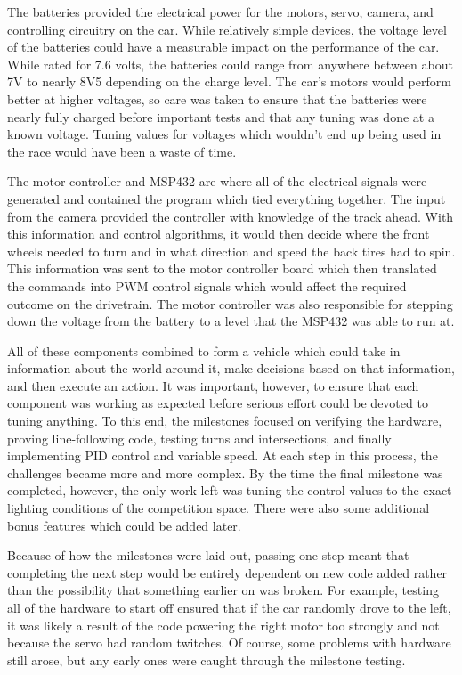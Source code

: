 \documentclass[conference]{IEEEtran}
\begin{document}
    The batteries provided the electrical power for the motors, servo, camera,
    and controlling circuitry on the car. While relatively simple devices, the
    voltage level of the batteries could have a measurable impact on the
    performance of the car. While rated for 7.6 volts, the batteries could
    range from anywhere between about 7V to nearly 8V5 depending on the charge
    level. The car's motors would perform better at higher voltages, so care
    was taken to ensure that the batteries were nearly fully charged before
    important tests and that any tuning was done at a known voltage. Tuning
    values for voltages which wouldn't end up being used in the race would
    have been a waste of time.
    
    The motor controller and MSP432 are where all of the electrical signals
    were generated and contained the program which tied everything together.
    The input from the camera provided the controller with knowledge of the
    track ahead. With this information and control algorithms, it would then
    decide where the front wheels needed to turn and in what direction and
    speed the back tires had to spin. This information was sent to the motor
    controller board which then translated the commands into PWM control
    signals which would affect the required outcome on the drivetrain. The
    motor controller was also responsible for stepping down the voltage from
    the battery to a level that the MSP432 was able to run at.

    All of these components combined to form a vehicle which could take in
    information about the world around it, make decisions based on that
    information, and then execute an action. It was important, however, to
    ensure that each component was working as expected before serious effort
    could be devoted to tuning anything. To this end, the milestones focused
    on verifying the hardware, proving line-following code, testing turns and
    intersections, and finally implementing PID control and variable speed.
    At each step in this process, the challenges became more and more complex.
    By the time the final milestone was completed, however, the only work left
    was tuning the control values to the exact lighting conditions of the
    competition space. There were also some additional bonus features which
    could be added later.

    Because of how the milestones were laid out, passing one step meant that
    completing the next step would be entirely dependent on new code added
    rather than the possibility that something earlier on was broken. For
    example, testing all of the hardware to start off ensured that if the car
    randomly drove to the left, it was likely a result of the code powering
    the right motor too strongly and not because the servo had random
    twitches. Of course, some problems with hardware still arose, but any
    early ones were caught through the milestone testing.
\end{document}
